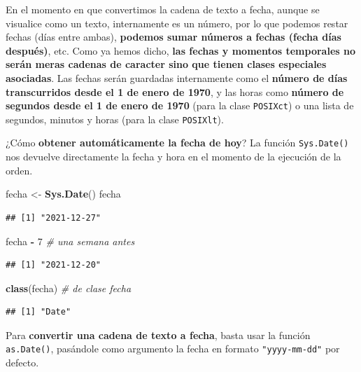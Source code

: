 \documentclass[11pt,]{book}
\newenvironment{Shaded}{\begin{snugshade}}{\end{snugshade}}
\newcommand{\CommentTok}[1]{\textcolor[rgb]{0.37,0.37,0.37}{\textit{#1}}}
\newcommand{\DecValTok}[1]{\textcolor[rgb]{0.06,0.06,0.06}{#1}}
\newcommand{\KeywordTok}[1]{\textcolor[rgb]{0.27,0.27,0.27}{\textbf{#1}}}
\newcommand{\NormalTok}[1]{#1}
\newcommand{\OperatorTok}[1]{\textcolor[rgb]{0.43,0.43,0.43}{\textbf{#1}}}
\newcommand{\StringTok}[1]{\textcolor[rgb]{0.5,0.5,0.5}{#1}}
\begin{document}
En el momento en que convertimos la cadena de texto a fecha, aunque se visualice como un texto, internamente es un número, por lo que podemos restar fechas (días entre ambas), \textbf{podemos sumar números a fechas (fecha días después)}, etc. Como ya hemos dicho, \textbf{las fechas y momentos temporales no serán meras cadenas de caracter sino que tienen clases especiales asociadas}. Las fechas serán guardadas internamente como el \textbf{número de días transcurridos desde el 1 de enero de 1970}, y las horas como \textbf{número de segundos desde el 1 de enero de 1970} (para la clase \texttt{POSIXct}) o una lista de segundos, minutos y horas (para la clase \texttt{POSIXlt}).

¿Cómo \textbf{obtener automáticamente la fecha de hoy}? La función \texttt{Sys.Date()} nos devuelve directamente la fecha y hora en el momento de la ejecución de la orden.

\begin{Shaded}
\begin{Highlighting}[]
\NormalTok{fecha <-}\StringTok{ }\KeywordTok{Sys.Date}\NormalTok{()}
\NormalTok{fecha}
\end{Highlighting}
\end{Shaded}

\begin{verbatim}
## [1] "2021-12-27"
\end{verbatim}

\begin{Shaded}
\begin{Highlighting}[]
\NormalTok{fecha }\OperatorTok{-}\StringTok{ }\DecValTok{7} \CommentTok{# una semana antes}
\end{Highlighting}
\end{Shaded}

\begin{verbatim}
## [1] "2021-12-20"
\end{verbatim}

\begin{Shaded}
\begin{Highlighting}[]
\KeywordTok{class}\NormalTok{(fecha) }\CommentTok{# de clase fecha}
\end{Highlighting}
\end{Shaded}

\begin{verbatim}
## [1] "Date"
\end{verbatim}

Para \textbf{convertir una cadena de texto a fecha}, basta usar la función \texttt{as.Date()}, pasándole como argumento la fecha en formato \texttt{"yyyy-mm-dd"} por defecto.
\end{document}
